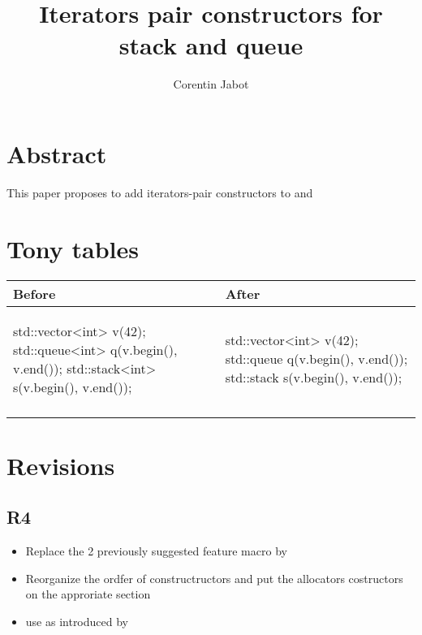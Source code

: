 \documentclass{wg21}
\title{Iterators pair constructors for stack and queue}
\author{Corentin Jabot}{corentin.jabot@gmail.com}
\begin{document}
\maketitle

\section{Abstract}

This paper proposes to add iterators-pair constructors to  and 

\section{Tony tables}
\begin{center}
\begin{tabular}{l|l}
Before & After\\ \hline

\begin{minipage}[t]{0.5\textwidth}
\begin{colorblock}
std::vector<int> v(42);
std::queue<int> q({v.begin(), v.end()});
std::stack<int> s({v.begin(), v.end()});
\end{colorblock}
\end{minipage}
&
\begin{minipage}[t]{0.3\textwidth}
\begin{colorblock}
std::vector<int> v(42);
std::queue q(v.begin(), v.end());
std::stack s(v.begin(), v.end());
\end{colorblock}
\end{minipage}
\\\\ \hline

\end{tabular}
\end{center}

\section{Revisions}

\subsection{R4}
\begin{itemize}
\item Replace the 2 previously suggested feature macro by 
\item Reorganize the ordfer of constructructors and put the allocators costructors on the approriate section
\item use  as introduced by 
\end{itemize}
\end{document}
